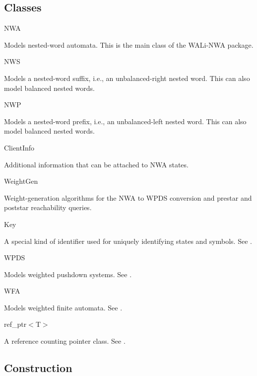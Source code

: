 \documentclass{llncs}
\begin{document}
\subsection{Classes}
\label{Se:Classes}

\begin{description}

\item NWA \nopagebreak

  Models nested-word automata.  This is the main class of the WALi-NWA package.

\item NWS \nopagebreak

  Models a nested-word suffix, i.e., an unbalanced-right nested word.  This can also model balanced nested words.

\item NWP \nopagebreak

  Models a nested-word prefix, i.e., an unbalanced-left nested word.  This can also model balanced nested words.

\item ClientInfo \nopagebreak

  Additional information that can be attached to NWA states.

\item WeightGen \nopagebreak

  Weight-generation algorithms for the NWA to WPDS conversion and prestar and poststar reachability queries.

\item Key \nopagebreak

  A special kind of identifier used for uniquely identifying states and symbols.  See \cite{wali}.

\item WPDS \nopagebreak

  Models weighted pushdown systems.  See \cite{wali}.

\item WFA \nopagebreak

  Models weighted finite automata.  See \cite{wali}.

\item ref\_ptr$<$T$>$ \nopagebreak

  A reference counting pointer class.  See \cite{wali}. \\

\end{description}


\subsection{Construction}
\label{Se:Construction}
\end{document}
